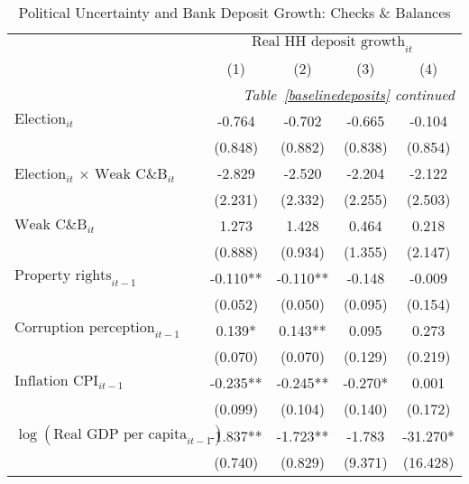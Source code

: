 \begin{longtable}{m{8cm}*{4}{c}}                                         \caption{Political Uncertainty and Bank Deposit Growth: Checks \& Balances \label{cbdeposits}}\\                                         \toprule                                         &\multicolumn{4}{c}{$\text{Real HH deposit growth}_{it}$} \\ \cmidrule(lr){2-5}
                    &         (1)   &         (2)   &         (3)   &         (4)   \\
\midrule\endfirsthead                                         \multicolumn{5}{r}{\textit{Table~\ref{baselinedeposits} continued}} \\                                         \toprule\endhead\midrule\endfoot\endlastfoot
$\text{Election}_{it}$&      -0.764   &      -0.702   &      -0.665   &      -0.104   \\
                    &     (0.848)   &     (0.882)   &     (0.838)   &     (0.854)   \\
$\text{Election}_{it}$ $\times$ $\text{Weak C\&B}_{it}$&      -2.829   &      -2.520   &      -2.204   &      -2.122   \\
                    &     (2.231)   &     (2.332)   &     (2.255)   &     (2.503)   \\
$\text{Weak C\&B}_{it}$&       1.273   &       1.428   &       0.464   &       0.218   \\
                    &     (0.888)   &     (0.934)   &     (1.355)   &     (2.147)   \\
$\text{Property rights}_{it-1}$&      -0.110** &      -0.110** &      -0.148   &      -0.009   \\
                    &     (0.052)   &     (0.050)   &     (0.095)   &     (0.154)   \\
$\text{Corruption perception}_{it-1}$&       0.139*  &       0.143** &       0.095   &       0.273   \\
                    &     (0.070)   &     (0.070)   &     (0.129)   &     (0.219)   \\
$\text{Inflation CPI}_{it-1}$&      -0.235** &      -0.245** &      -0.270*  &       0.001   \\
                    &     (0.099)   &     (0.104)   &     (0.140)   &     (0.172)   \\
$\log(\text{Real GDP per capita}_{it-1})$&      -1.837** &      -1.723** &      -1.783   &     -31.270*  \\
                    &     (0.740)   &     (0.829)   &     (9.371)   &    (16.428)   \\

\end{longtable}
